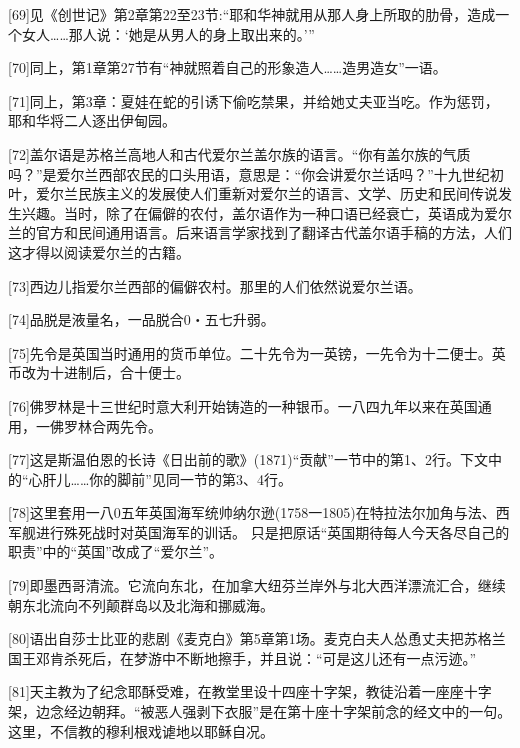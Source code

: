 \documentclass{article}
\begin{document}
[69]见《创世记》第2章第22至23节:“耶和华神就用从那人身上所取的肋骨，造成一个女人……那人说：‘她是从男人的身上取出来的。’”



[70]同上，第1章第27节有“神就照着自己的形象造人……造男造女”一语。



[71]同上，第3章：夏娃在蛇的引诱下偷吃禁果，并给她丈夫亚当吃。作为惩罚，耶和华将二人逐出伊甸园。



[72]盖尔语是苏格兰高地人和古代爱尔兰盖尔族的语言。“你有盖尔族的气质吗？”是爱尔兰西部农民的口头用语，意思是：“你会讲爱尔兰话吗？”十九世纪初叶，爱尔兰民族主义的发展使人们重新对爱尔兰的语言、文学、历史和民间传说发生兴趣。当时，除了在偏僻的农付，盖尔语作为一种口语已经衰亡，英语成为爱尔兰的官方和民间通用语言。后来语言学家找到了翻译古代盖尔语手稿的方法，人们这才得以阅读爱尔兰的古籍。



[73]西边儿指爱尔兰西部的偏僻农村。那里的人们依然说爱尔兰语。



[74]品脱是液量名，一品脱合0・五七升弱。



[75]先令是英国当时通用的货币单位。二十先令为一英镑，一先令为十二便士。英币改为十进制后，合十便士。



[76]佛罗林是十三世纪时意大利开始铸造的一种银币。一八四九年以来在英国通用，一佛罗林合两先令。



[77]这是斯温伯恩的长诗《日出前的歌》(1871)“贡献”一节中的第1、2行。下文中的“心肝儿……你的脚前”见同一节的第3、4行。



[78]这里套用一八0五年英国海军统帅纳尔逊(1758一1805)在特拉法尔加角与法、西军舰进行殊死战时对英国海军的训话。 只是把原话“英国期待每人今天各尽自己的职责”中的“英国”改成了“爱尔兰”。



[79]即墨西哥清流。它流向东北，在加拿大纽芬兰岸外与北大西洋漂流汇合，继续朝东北流向不列颠群岛以及北海和挪威海。



[80]语出自莎士比亚的悲剧《麦克白》第5章第1场。麦克白夫人怂恿丈夫把苏格兰国王邓肯杀死后，在梦游中不断地擦手，并且说：“可是这儿还有一点污迹。”



[81]天主教为了纪念耶酥受难，在教堂里设十四座十字架，教徒沿着一座座十字架，边念经边朝拜。“被恶人强剥下衣服”是在第十座十字架前念的经文中的一句。这里，不信教的穆利根戏谑地以耶稣自况。
\end{document}
